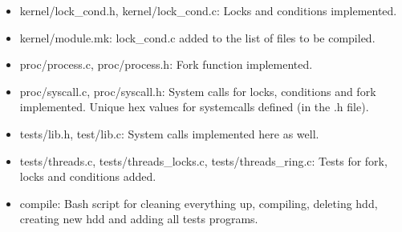 \documentclass[11pt,a4paper]{article}
\begin{document}
\begin{itemize}
\item kernel/lock\_cond.h, kernel/lock\_cond.c: Locks and conditions implemented.
\item kernel/module.mk: lock\_cond.c added to the list of files to be compiled.
\item proc/process.c, proc/process.h: Fork function implemented.
\item proc/syscall.c, proc/syscall.h: System calls for locks, conditions and fork implemented. Unique hex values for systemcalls defined (in the .h file).
\item tests/lib.h, test/lib.c: System calls implemented here as well.
\item tests/threads.c, tests/threads\_locks.c, tests/threads\_ring.c: Tests for fork, locks and conditions added.
\item compile: Bash script for cleaning everything up, compiling, deleting hdd, creating new hdd and adding all tests programs.

\end{itemize}
\end{document}

